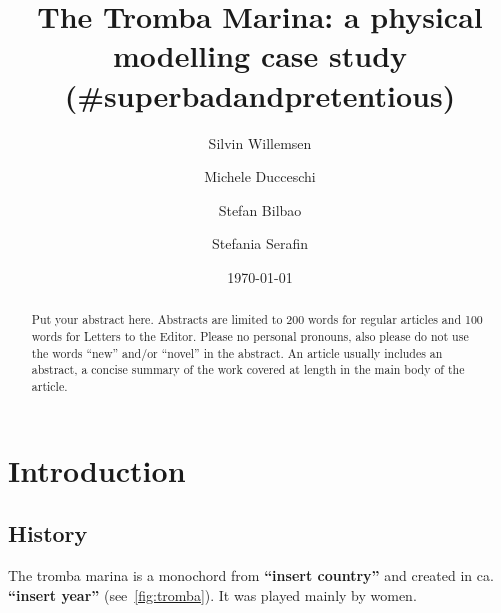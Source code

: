 \documentclass[reprint,NumberedRefs]{JASAnew}
\begin{document}
\title[JASA/Sample JASA Article]{The Tromba Marina: a physical modelling case study (\#superbadandpretentious)}
\author{Silvin Willemsen}
\author{Michele Ducceschi}
\author{Stefan Bilbao}

\author{Stefania Serafin}
 


\date{\today} 

\begin{abstract}
Put your abstract here. Abstracts are limited to 200 words for
regular articles and 100 words for Letters to the Editor. Please no
personal pronouns, also please do not use the words ``new'' and/or
``novel'' in the abstract. An article usually includes an abstract, a
concise summary of the work covered at length in the main body of the
article.     
\end{abstract}


\maketitle



\section{\label{sec:1} Introduction}

\subsection{History}
The tromba marina is a monochord from \textbf{``insert country''} and created in ca. \textbf{``insert year''} (see~\ref{fig:tromba}). It was played mainly by women.



 
\end{document}
